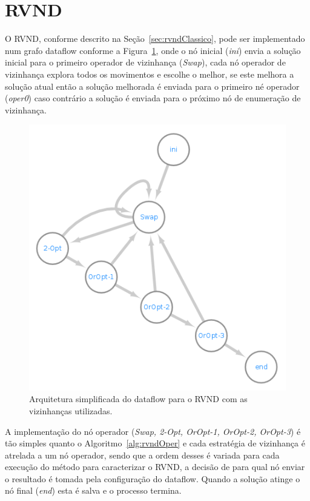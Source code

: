\section{RVND}

O RVND, conforme descrito na Seção~\ref{sec:rvndClassico}, pode ser implementado num grafo dataflow conforme a Figura~\ref{fig:rvndGraph}, onde o nó inicial (\textit{ini}) envia a solução inicial para o primeiro operador de vizinhança (\textit{Swap}), cada nó operador de vizinhança explora todos os movimentos e escolhe o melhor, se este melhora a solução atual então a solução melhorada é enviada para o primeiro né operador (\textit{oper0}) caso contrário a solução é enviada para o próximo nó de enumeração de vizinhança.

\begin{figure}[htbp]
    \centerline{\includegraphics[scale=0.5]{figuras/rvnd/RVND_dataflow_nomes.png}}
    \caption{Arquitetura simplificada do dataflow para o RVND com as vizinhanças utilizadas.}
    \label{fig:rvndGraph}
\end{figure}

A implementação do nó operador (\textit{Swap, 2-Opt, OrOpt-1, OrOpt-2, OrOpt-3}) é tão simples quanto o Algoritmo~\ref{alg:rvndOper} e cada estratégia de vizinhança é atrelada a um nó operador, sendo que a ordem desses é variada para cada execução do método para caracterizar o RVND, a decisão de para qual nó enviar o resultado é tomada pela configuração do dataflow.
Quando a solução atinge o nó final (\textit{end}) esta é salva e o processo termina.

